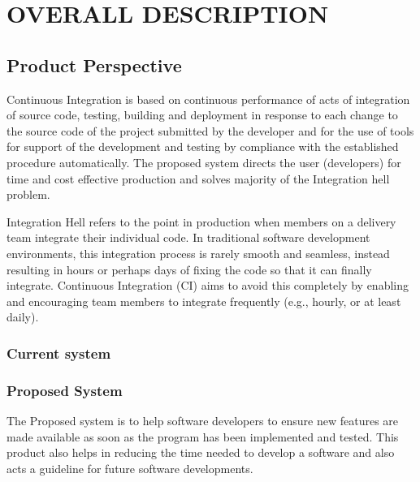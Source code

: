 \documentclass[12pt,a4paper,oneside]{report}
\begin{document}
\chapter{OVERALL DESCRIPTION}
\section{Product Perspective}
\par
Continuous Integration is based on continuous performance of acts of integration of
source code, testing, building and deployment in response to each change to the source code of
the project submitted by the developer and for the use of tools for support of the development
and testing by compliance with the established procedure automatically. The proposed system
directs the user (developers) for time and cost effective production and solves majority of the
Integration hell problem. \par
Integration Hell refers to the point in production when members on a delivery team integrate
their individual code. In traditional software development environments, this integration
process is rarely smooth and seamless, instead resulting in hours or perhaps days of fixing the
code so that it can finally integrate. Continuous Integration (CI) aims to avoid this completely
by enabling and encouraging team members to integrate frequently (e.g., hourly, or at least
daily).
\subsection{Current system}
\par
\subsection{Proposed System}
\par 
The Proposed system is to help software developers to ensure new features are made
available as soon as the program has been implemented and tested. This product also helps in
reducing the time needed to develop a software and also acts a guideline for future software
developments.
\end{document}
